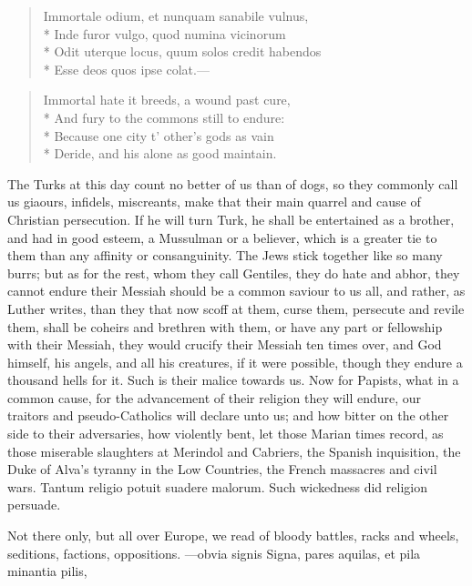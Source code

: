 {\begin{latin}
\begin{verse}
Immortale odium, et nunquam sanabile vulnus,\\*
Inde furor vulgo, quod numina vicinorum\\*
Odit uterque locus, quum solos credit habendos\\*
Esse deos quos ipse colat.---
\end{verse}
\end{latin}

\begin{verse}
Immortal hate it breeds, a wound past cure,\\*
And fury to the commons still to endure:\\*
Because one city t' other's gods as vain\\*
Deride, and his alone as good maintain.
\end{verse}

The Turks at this day count no better of us than of dogs, so they
commonly call us giaours, infidels, miscreants, make that their main
quarrel and cause of Christian persecution. If he will turn Turk, he
shall be entertained as a brother, and had in good esteem, a Mussulman
or a believer, which is a greater tie to them than any affinity or
consanguinity. The Jews stick together like so many burrs; but as for
the rest, whom they call Gentiles, they do hate and abhor, they cannot
endure their Messiah should be a common saviour to us all, and rather,
as Luther writes, than they that now scoff at them, curse them,
persecute and revile them, shall be coheirs and brethren with them, or
have any part or fellowship with their Messiah, they would crucify
their Messiah ten times over, and God himself, his angels, and all his
creatures, if it were possible, though they endure a thousand hells for
it. Such is their malice towards us. Now for Papists, what in a common
cause, for the advancement of their religion they will endure, our
traitors and pseudo-Catholics will declare unto us; and how bitter on
the other side to their adversaries, how violently bent, let those
Marian times record, as those miserable slaughters at Merindol and
Cabriers, the Spanish inquisition, the Duke of Alva's tyranny in the
Low Countries, the French massacres and civil wars. Tantum
religio potuit suadere malorum. Such wickedness did religion persuade.

Not there only, but all over Europe, we read of bloody battles, racks
and wheels, seditions, factions, oppositions.
---obvia signis
Signa, pares aquilas, et pila minantia pilis,

}
